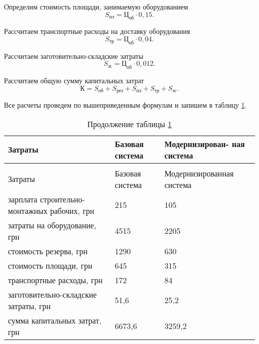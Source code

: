         Определим стоимость площади, занимаемую оборудованием
        \begin{equation}
            S_\text{пл} = \text{Ц}_\text{об} \cdot 0,15.
        \end{equation}

        Рассчитаем транспортные расходы на доставку оборудования
        \begin{equation}
            S_\text{тр} = \text{Ц}_\text{об} \cdot 0,04.
        \end{equation}

        Рассчитаем заготовительно-складские затраты
        \begin{equation}
            S_\text{зс} = \text{Ц}_{об} \cdot 0,012. 
        \end{equation}

        Рассчитаем общую сумму капитальных затрат
        \begin{equation}
            К = S_\text{об} + S_\text{рез} +
                S_\text{пл} + S_\text{тр} + S_\text{зс}. 
        \end{equation}

        Все расчеты проведем по вышеприведенным формулам и запишем в таблицу
        \ref{table:capital-cost}.

        \begin{longtable}{|p{8cm}|p{3cm}|p{4cm}|}
            \caption{Капитальные затраты на оборудование
                \label{table:capital-cost}}\\
            \hline
            Затраты & Базовая система & Модернизирован- ная система\\
            \hline
            \endfirsthead
            \caption*{Продолжение таблицы \ref{table:capital-cost}}\\
            \hline
            Затраты & Базовая система & Модернизированная система\\
            \endhead
            \hline
            зарплата строительно-монтажных рабочих, грн & 215 & 105\\
            \hline
            затраты на оборудование, грн & 4515 & 2205\\
            \hline
            стоимость резерва, грн & 1290 & 630\\
            \hline
            стоимость площади, грн & 645 & 315\\
            \hline
            транспортные расходы, грн & 172 & 84\\
            \hline
            заготовительно-складские затраты, грн & 51,6 & 25,2\\
            \hline
            сумма капитальных затрат, грн & 6673,6 & 3259,2\\
            \hline
        \end{longtable}

